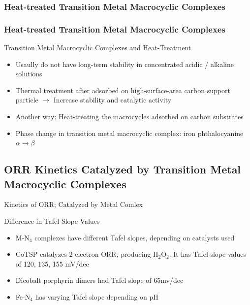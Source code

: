 \documentclass{beamer}
\begin{document}
\subsubsection{Heat-treated Transition Metal Macrocyclic Complexes}
\begin{frame}
    \frametitle{Heat-treated Transition Metal Macrocyclic Complexes}
    \begin{block}{Transition Metal Macrocyclic Complexes and Heat-Treatment}
    \begin{itemize}
    \item{Usaully do not have long-term stability in concentrated acidic / alkaline solutions}
    \item{Thermal treatment after adsorbed on high-surface-area carbon support particle $\longrightarrow$ Increase stability and catalytic activity}
    \item{Another way: Heat-treating the macrocycles adsorbed on carbon substrates}
    \item{Phase change in transition metal macrocyclic complex: iron phthalocyanine $\alpha \longrightarrow \beta$}
    
    \end{itemize}
    
    \end{block}
\end{frame}
\subsection{ORR Kinetics Catalyzed by Transition Metal Macrocyclic Complexes}
\begin{frame}{Kinetics of ORR; Catalyzed by Metal Comlex}
\begin{block}{Difference in Tafel Slope Values}
\begin{itemize}
\item{\alert{M-N$_4$ complexes} have different Tafel slopes, depending on catalysts used}
\item{\alert{CoTSP} catalyzes 2-electron ORR, producing H$_2$O$_2$. It has Tafel slope values of 120, 135, 155 mV/dec}
\item{\alert{Dicobalt porphyrin dimers} had Tafel slope of 65mv/dec}
\item{\alert{Fe-N$_4$} has varying Tafel slope depending on pH}


\end{itemize}
\end{block}
\end{frame}
\end{document}
